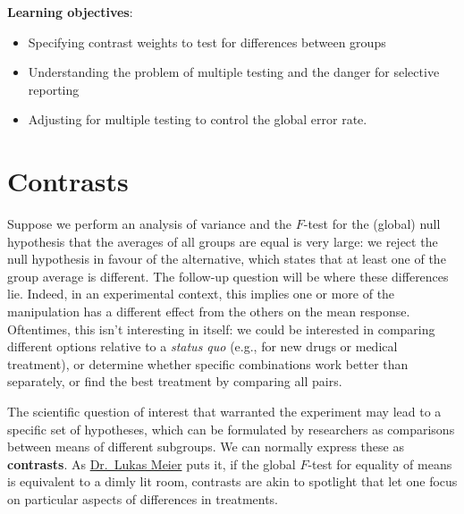 \documentclass[
  11pt,
  letterpaper,
]{scrbook}
\providecommand{\tightlist}{%
  \setlength{\itemsep}{0pt}\setlength{\parskip}{0pt}}\usepackage{longtable,booktabs,array}
\theoremstyle{definition}
\theoremstyle{remark}
\begin{document}
\begin{tcolorbox}[enhanced jigsaw, breakable, toptitle=1mm, left=2mm, bottomrule=.15mm, colframe=quarto-callout-important-color-frame, colback=white, rightrule=.15mm, title=\textcolor{quarto-callout-important-color}{\faExclamation}\hspace{0.5em}{Key concept}, opacityback=0, toprule=.15mm, titlerule=0mm, colbacktitle=quarto-callout-important-color!10!white, bottomtitle=1mm, arc=.35mm, coltitle=black, opacitybacktitle=0.6, leftrule=.75mm]

\textbf{Learning objectives}:

\begin{itemize}
\tightlist
\item
  Specifying contrast weights to test for differences between groups
\item
  Understanding the problem of multiple testing and the danger for
  selective reporting
\item
  Adjusting for multiple testing to control the global error rate.
\end{itemize}

\end{tcolorbox}

\hypertarget{contrasts}{%
\section{Contrasts}\label{contrasts}}

Suppose we perform an analysis of variance and the \(F\)-test for the
(global) null hypothesis that the averages of all groups are equal is
very large: we reject the null hypothesis in favour of the alternative,
which states that at least one of the group average is different. The
follow-up question will be where these differences lie. Indeed, in an
experimental context, this implies one or more of the manipulation has a
different effect from the others on the mean response. Oftentimes, this
isn't interesting in itself: we could be interested in comparing
different options relative to a \emph{status quo} (e.g., for new drugs
or medical treatment), or determine whether specific combinations work
better than separately, or find the best treatment by comparing all
pairs.

The scientific question of interest that warranted the experiment may
lead to a specific set of hypotheses, which can be formulated by
researchers as comparisons between means of different subgroups. We can
normally express these as \textbf{contrasts}. As
\href{https://stat.ethz.ch/~meier}{Dr.~Lukas Meier} puts it, if the
global \(F\)-test for equality of means is equivalent to a dimly lit
room, contrasts are akin to spotlight that let one focus on particular
aspects of differences in treatments.
\end{document}

